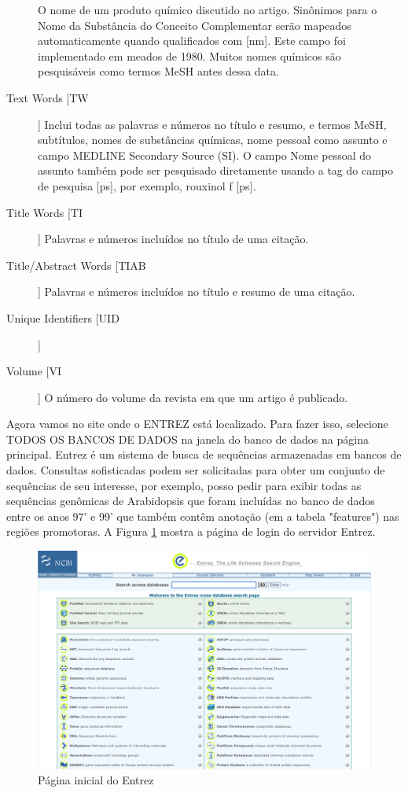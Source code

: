 \documentclass[letter,11pt]{book}
\begin{document}
\begin{description}
O nome de um produto químico discutido no artigo. Sinônimos para o Nome da Substância do Conceito Complementar serão mapeados automaticamente quando qualificados com [nm]. Este campo foi implementado em meados de 1980. Muitos nomes químicos são pesquisáveis como termos MeSH antes dessa data.
\item[Text Words [TW]] Inclui todas as palavras e números no título e resumo, e termos MeSH, subtítulos, nomes de substâncias químicas, nome pessoal como assunto e campo MEDLINE Secondary Source (SI). O campo Nome pessoal do assunto também pode ser pesquisado diretamente usando a tag do campo de pesquisa [ps], por exemplo, rouxinol f [ps]. 
\item[Title Words [TI]] Palavras e números incluídos no título de uma citação. 
\item[Title/Abstract Words [TIAB]] Palavras e números incluídos no título e resumo de uma citação.
\item[Unique Identifiers [UID]]
\item[Volume [VI]] O número do volume da revista em que um artigo é publicado. 
\end{description}

Agora vamos no site onde o ENTREZ está localizado. Para fazer isso, selecione TODOS OS BANCOS DE DADOS na janela do banco de dados na página principal. Entrez é um sistema de busca de sequências armazenadas em bancos de dados.
Consultas sofisticadas podem ser solicitadas para obter um conjunto de sequências de seu interesse, por exemplo, posso pedir para exibir todas as sequências genômicas de Arabidopsis que foram incluídas no banco de dados entre os anos 97' e 99' que também contêm anotação (em a tabela "features") nas regiões promotoras. A Figura \ref{screenshotentrez} mostra a página de login do servidor Entrez.

\begin{figure}[ht]
\centering
   \includegraphics[width=15cm]{Figs/screenshotEntrez.png}
  \caption{\label{screenshotentrez}Página inicial do Entrez}
\end{figure}
\end{document}
